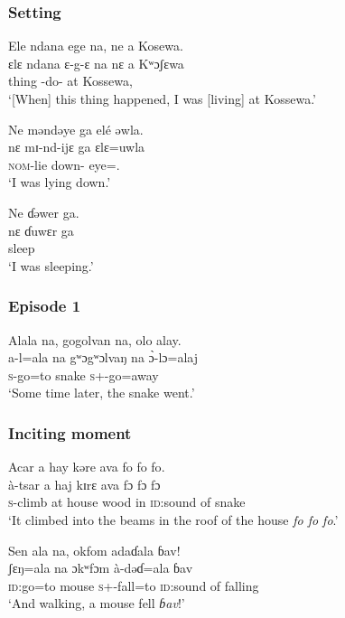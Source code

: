 \subsubsection*{Setting}
\ea
Ele  ndana  ege  na,  ne  a Kosewa.\\
\gll ɛlɛ     ndana  ɛ-g-ɛ    na    nɛ   a Kʷɔʃɛwa\\
thing {\DEM}    {\SSS-do{}-\CL}  {\PSP}     {\oneS}  at  Kossewa,\\
\glt ‘[When] this thing happened, I was [living] at Kossewa.’\\
\z

\noindent\parbox{\textwidth}{\ea
Ne məndəye  ga  elé  əwla.\\
\gll nɛ  mɪ-nd-ijɛ    ga  ɛlɛ=uwla\\
{\oneS}  {\textsc{nom}-lie down-{\CL}}   {\ADJ}   eye=\oneS.{\POSS}  \\
\glt ‘I was lying down.’
\z}

\ea 
Ne ɗəwer ga.\\
\gll nɛ   ɗuwɛr  ga\\
{\oneS}   sleep    {\ADJ} \\
\glt ‘I was sleeping.’
\z

\subsubsection*{Episode 1}
\ea 
 Alala  na, gogolvan  na, olo  alay.\\
\gll a-l=ala na gʷɔgʷɔlvaŋ   na \`ɔ{}-lɔ=alaj\\
\textsc{s}-go=to       {\PSP}  snake      {\PSP}   \textsc{s}+{\PFV}-go=away\\
\glt ‘Some time later, the snake went.’
\z

\subsubsection*{Inciting moment}
\ea
 Acar  a  hay  kəre  ava  {fo fo fo}.\\
\gll à-tsar  a  haj  kɪrɛ  ava  {fɔ fɔ fɔ}\\
\textsc{s}-climb at house   wood      in {\textsc{id}:sound of snake}\\
\glt ‘It climbed into the beams in the roof of the house \textit{fo fo fo}.’
\z

\ea 
 Sen  ala  na,  okfom  adaɗala   ɓav!\\
\gll ʃɛŋ=ala     na ɔkʷfɔm   à-dəɗ=ala   ɓav\\
\textsc{id}:go=to      {\PSP}   mouse  \textsc{s}+{\PFV}-fall=to     {\textsc{id}:sound of falling} \\
\glt ‘And walking, a mouse fell \textit{ɓav}!’
\z

